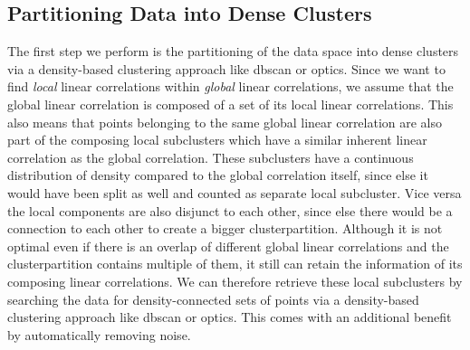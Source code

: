 \subsection{Partitioning Data into Dense Clusters}
The first step we perform is the partitioning of the data space into dense clusters via a density-based clustering approach like \gls{dbscan} or \gls{optics}. 
Since we want to find \textit{local} linear correlations within \textit{global} linear correlations, we assume that the global linear correlation is composed of a set of its local linear correlations. This also means that points belonging to the same global linear correlation are also part of the composing local subclusters which have a similar inherent linear correlation as the global correlation. These subclusters have a continuous distribution of density compared to the global correlation itself, since else it would have been split as well and counted as separate local subcluster. Vice versa the local components are also disjunct to each other, since else there would be a connection to each other to create a bigger clusterpartition. Although it is not optimal even if there is an overlap of different global linear correlations and the clusterpartition contains multiple of them, it still can retain the information of its composing linear correlations.
We can therefore retrieve these local subclusters by searching the data for density-connected sets of points via a density-based clustering approach like \gls{dbscan} or \gls{optics}. This comes with an additional benefit by automatically removing noise. 

